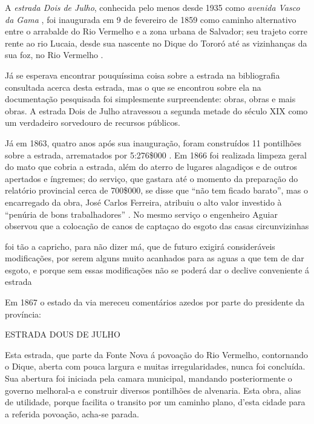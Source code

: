 A \textit{estrada Dois de Julho}, conhecida pelo menos desde 1935 como \textit{avenida Vasco da Gama} \cite[p.~142]{souza_guia_1935}, foi inaugurada em 9 de fevereiro de 1859 \cite[p.~20]{silvalima_dique_1899} como caminho alternativo entre o arrabalde do Rio Vermelho e a zona urbana de Salvador; seu trajeto corre rente ao rio Lucaia, desde sua nascente no Dique do Tororó até as vizinhanças da sua foz, no Rio Vermelho \cite[p.~582]{ruy_politica_1949}.

Já se esperava encontrar pouquíssima coisa sobre a estrada na bibliografia consultada acerca desta estrada, mas o que se encontrou sobre ela na documentação pesquisada foi simplesmente surpreendente: obras, obras e mais obras. A estrada Dois de Julho atravessou a segunda metade do século XIX como um verdadeiro sorvedouro de recursos públicos.

Já em 1863, quatro anos após sua inauguração, foram construídos 11 pontilhões sobre a estrada, arrematados por 5:276\$000 \cite[p.~66]{bahia_rpe_1863b}. Em 1866 foi realizada limpeza geral do mato que cobria a estrada, além do aterro de lugares alagadiços e de outros apertados e íngremes; do serviço, que gastara até o momento da preparação do relatório provincial cerca de 700\$000, se disse que ``não tem ficado barato'', mas o encarregado da obra, José Carlos Ferreira, atribuiu o alto valor investido à ``penúria de bons trabalhadores'' \cite[p.~76]{bahia_rpe_1866}. No mesmo serviço o engenheiro Aguiar observou que a colocação de canos de captaçao do esgoto das casas circunvizinhas 

\begin{citacao}
foi tão a capricho, para não dizer má, que de futuro exigirá consideráveis modificações, por serem alguns muito acanhados para as aguas a que tem de dar esgoto, e porque sem essas modificações não se poderá dar o declive conveniente á estrada \cite[p.~76]{bahia_rpe_1866}
\end{citacao}

Em 1867 o estado da via mereceu comentários azedos por parte do presidente da província:

\begin{citacao}
ESTRADA DOUS DE JULHO

Esta estrada, que parte da Fonte Nova á povoação do Rio Vermelho, contornando o Dique, aberta com pouca largura e muitas irregularidades, nunca foi concluída. Sua abertura foi iniciada pela camara municipal, mandando posteriormente o governo melhoral-a e construir diversos pontilhões de alvenaria. 
Esta obra, alias de utilidade, porque facilita o transito por um caminho plano, d'esta cidade para a referida povoação, acha-se parada. \cite[obras publicas,~p.~9]{bahia_rpe_1867}
\end{citacao}

